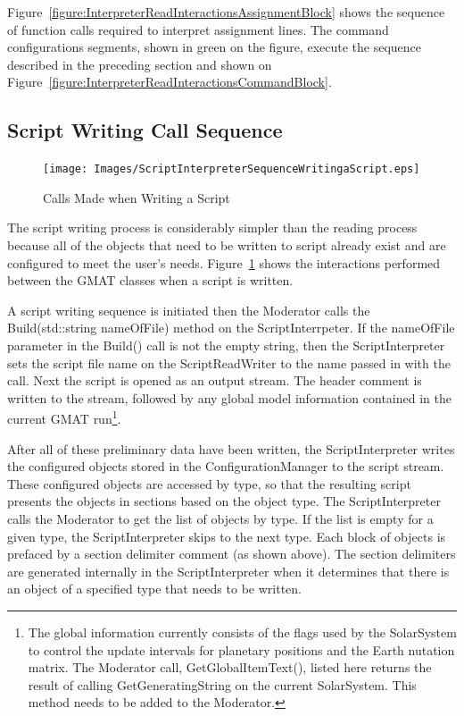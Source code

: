 Figure~\ref{figure:InterpreterReadInteractionsAssignmentBlock} shows the sequence of function calls
required to interpret assignment lines.  The command configurations segments, shown in green on the
figure, execute the sequence described in the preceding section and shown on
Figure~\ref{figure:InterpreterReadInteractionsCommandBlock}.

\subsection{\label{section:SIWriteSequence}Script Writing Call Sequence}

\begin{figure}
\begin{center}
\texttt{[image: Images/ScriptInterpreterSequenceWritingaScript.eps]}
\caption{\label{figure:InterpreterWriteSequence}Calls Made when Writing a
Script}
\end{center}
\end{figure}

The script writing process is considerably simpler than the reading process because all of the
objects that need to be written to script already exist and are configured to meet the user's
needs.  Figure~\ref{figure:InterpreterWriteSequence} shows the interactions performed between the
GMAT classes when a script is written.

A script writing sequence is initiated then the Moderator calls the Build(std::string nameOfFile)
method on the ScriptInterrpeter.  If the nameOfFile parameter in the Build() call is not the empty
string, then the ScriptInterpreter sets the script file name on the ScriptReadWriter to the name
passed in with the call.  Next the script is opened as an output stream.  The header comment is
written to the stream, followed by any global model information contained in the current GMAT
run\footnote{The global information currently consists of the flags used by the SolarSystem to
control the update intervals for planetary positions and the Earth nutation matrix.  The Moderator
call, GetGlobalItemText(), listed here returns the result of calling GetGeneratingString on the
current SolarSystem.  This method needs to be added to the Moderator.}.

After all of these preliminary data have been written, the ScriptInterpreter writes the configured
objects stored in the ConfigurationManager to the script stream.  These configured objects are
accessed by type, so that the resulting script presents the objects in sections based on the object
type.  The ScriptInterpreter calls the Moderator to get the list of objects by type.  If the list
is empty for a given type, the ScriptInterpreter skips to the next type.  Each block of objects is
prefaced by a section delimiter comment (as shown above). The section delimiters are generated
internally in the ScriptInterpreter when it determines that there is an object of a specified type
that needs to be written.

